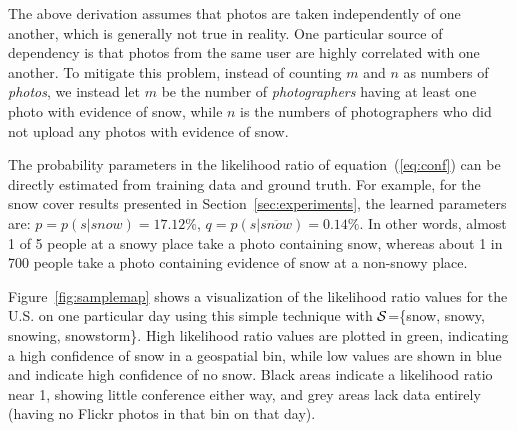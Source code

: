 
The above derivation assumes that photos are taken independently of
one another, which is generally not true in reality. One particular
source of dependency is that photos from the same user are highly
correlated with one another.  To mitigate this problem, instead of
counting $m$ and $n$ as numbers of \textit{photos}, we instead let $m$ be 
the number of \textit{photographers} having at least one photo with evidence of snow,
while $n$ is the numbers of photographers who did not upload any
photos with evidence of snow.

The probability parameters in the likelihood ratio of
equation~(\ref{eq:conf}) can be directly estimated from training data
and ground truth. For example, for the snow cover results
presented in Section~\ref{sec:experiments}, the learned parameters are: $p
= p(s|snow) = 17.12\%$, $q = p(s|\overline{snow}) = 0.14\%$.  In other
words, almost 1 of 5 people at a snowy place take a photo containing
snow, whereas about 1 in 700 people take a photo containing evidence
of snow at a non-snowy place.

Figure~\ref{fig:samplemap} shows a visualization of the likelihood
ratio values for the U.S. on one particular day using this simple
technique with ${\cal S}$=\{snow, snowy, snowing, snowstorm\}.  High
likelihood ratio values are plotted
in green, indicating a high confidence of snow in a geospatial bin,
while low values are shown in blue and indicate high confidence of 
no snow.  Black areas indicate a likelihood ratio 
near 1, showing little conference either way, and grey areas lack
data entirely (having no Flickr photos in that bin on that day).






